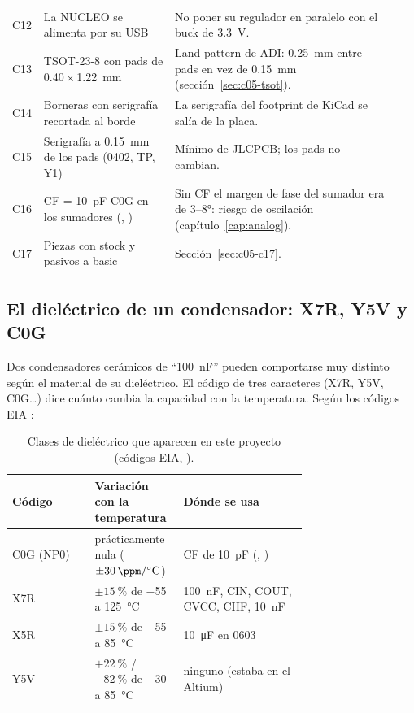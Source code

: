 {\begin{longtable}{@{}L{0.05\linewidth}L{0.33\linewidth}L{0.56\linewidth}@{}}
C12 & La NUCLEO se alimenta por su USB & No poner su regulador en paralelo con el buck de \SI{3.3}{\volt}.\\
C13 & TSOT-23-8 con pads de \num{0.40}\,$\times$\,\SI{1.22}{\milli\meter} & Land pattern de ADI: \SI{0.25}{\milli\meter} entre pads en vez de \SI{0.15}{\milli\meter} (sección~\ref{sec:c05-tsot}).\\
C14 & Borneras con serigrafía recortada al borde & La serigrafía del footprint de KiCad se salía de la placa.\\
C15 & Serigrafía a \SI{0.15}{\milli\meter} de los pads (0402, TP, Y1) & Mínimo de JLCPCB; los pads no cambian.\\
C16 & CF = \SI{10}{\pico\farad} C0G en los sumadores (, ) & Sin CF el margen de fase del sumador era de 3--\ang{8}: riesgo de oscilación (capítulo~\ref{cap:analog}).\\
C17 & Piezas con stock y pasivos a basic & Sección~\ref{sec:c05-c17}.\\
\end{longtable}
}

\subsection{El dieléctrico de un condensador: X7R, Y5V y C0G}\label{sec:c05-dielectricos}

Dos condensadores cerámicos de ``\SI{100}{\nano\farad}'' pueden comportarse muy distinto según el material de su dieléctrico. El código de tres caracteres (X7R, Y5V, C0G\ldots) dice cuánto cambia la capacidad con la temperatura. Según los códigos EIA \copia:

\begin{table}[h]
\centering
\caption{Clases de dieléctrico que aparecen en este proyecto (códigos EIA, \copia).}\label{tab:c05-dielectricos}
\begin{tabular}{@{}lL{0.3\linewidth}L{0.42\linewidth}@{}}\toprule
Código & Variación con la temperatura & Dónde se usa\\\midrule
C0G (NP0) & prácticamente nula ($\pm\SI{30}{\ppm\per\degreeCelsius}$) & CF de \SI{10}{\pico\farad} (, )\\
X7R & $\pm\SI{15}{\percent}$ de \SI{-55}{} a \SI{125}{\degreeCelsius} & \SI{100}{\nano\farad}, CIN, COUT, CVCC, CHF, \SI{10}{\nano\farad}\\
X5R & $\pm\SI{15}{\percent}$ de \SI{-55}{} a \SI{85}{\degreeCelsius} & \SI{10}{\micro\farad} en 0603\\
Y5V & $+\SI{22}{\percent}$ / $-\SI{82}{\percent}$ de \SI{-30}{} a \SI{85}{\degreeCelsius} & ninguno (estaba en el Altium)\\
\bottomrule
\end{tabular}
\end{table}

